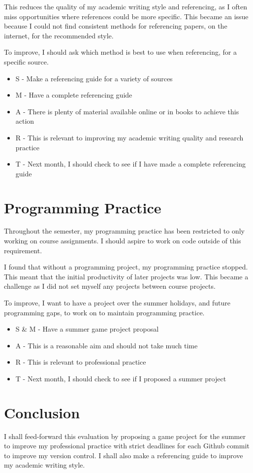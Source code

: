\documentclass{scrartcl}
\begin{document}
This reduces the quality of my academic writing style and referencing, as I often miss opportunities where references could be more specific. This became an issue because I could not find consistent methods for referencing papers, on the internet, for the recommended style.  

To improve, I should ask which method is best to use when referencing, for a specific source.

 \begin{itemize}
   \item  S - Make a referencing guide for a variety of sources
	\item M - Have a complete referencing guide
	\item A - There is plenty of material available online or in books to achieve this action
	\item R - This is relevant to improving my academic writing quality and research practice
	\item T - Next month, I should check to see if I have made a complete referencing guide
 \end{itemize}

\section*{Programming Practice}
Throughout the semester, my programming practice has been restricted to only working on course assignments. I should aspire to work on code outside of this requirement.

I found that without a programming project, my programming practice stopped. This meant that the initial productivity of later projects was low. This became a challenge as I did not set myself any projects between course projects.

To improve, I want to have a project over the summer holidays, and future programming gaps, to work on to maintain programming practice.

 \begin{itemize}
   \item  S \& M - Have a summer game project proposal
	\item A - This is a reasonable aim and should not take much time
	\item R - This is relevant to professional practice
	\item T - Next month, I should check to see if I proposed a summer project
 \end{itemize}
 
 \section*{Conclusion}
I shall feed-forward this evaluation by proposing a game project for the summer to improve my professional practice with strict deadlines for each Github commit to improve my version control. I shall also make a referencing guide to improve my academic writing style.
\end{document}
